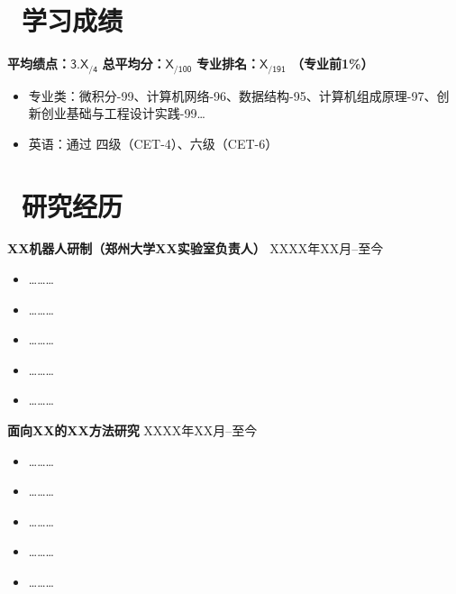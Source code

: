 \documentclass[11pt]{article}
\begin{document}
\section{\texorpdfstring{\makebox[\widthof{\faFileText}][c]{\color{ZZU_BLUE}\faFileText}\ 学习成绩}{学习成绩}}

{\bfseries 平均绩点：$\mathsf{3.X_{/4}}$} \hspace{0.5em}
{\bfseries 总平均分：$\mathsf{X_{/100}}$} \hspace{0.5em}
{\bfseries 专业排名：$\mathsf{X_{/191}}$ （专业前1\%）}
\begin{itemize}[parsep=0.5ex]
    \item {专业类：微积分-99、计算机网络-96、数据结构-95、计算机组成原理-97、创新创业基础与工程设计实践-99\ldots}
    \item {英语：通过 四级（CET-4）、六级（CET-6）}
\end{itemize}

\section{\texorpdfstring{\makebox[\widthof{\faUniversity}][c]{\color{ZZU_BLUE}\faUniversity}\ 研究经历}{研究经历}}

{\bfseries XX机器人研制（郑州大学XX实验室负责人）} \hfill XXXX年XX月\hspace{0.5em}--\hspace{0.5em}至今
\begin{itemize}
    \item {\ldots\ldots\ldots}
    \item {\ldots\ldots\ldots}
    \item {\ldots\ldots\ldots}
    \item {\ldots\ldots\ldots}
    \item {\ldots\ldots\ldots}
\end{itemize}

{\bfseries 面向XX的XX方法研究} \hfill XXXX年XX月\hspace{0.5em}--\hspace{0.5em}至今
\begin{itemize}
    \item {\ldots\ldots\ldots}
    \item {\ldots\ldots\ldots}
    \item {\ldots\ldots\ldots}
    \item {\ldots\ldots\ldots}
    \item {\ldots\ldots\ldots}
\end{itemize}
\end{document}
